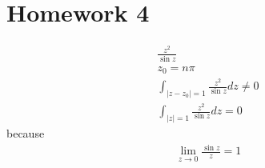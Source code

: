 \chapter{Homework 4} %

\begin{example}

    \begin{align*}
        \frac{z^2}{\sin z}                               \\
        z_0 = n\pi                                       \\
        \int_{|z -z_0| = 1} \frac{z^2}{\sin z} dz \neq 0 \\
        \int_{|z| = 1} \frac{z^2}{\sin z} dz = 0
    \end{align*}
    because
    \begin{align*}
        \lim_{z \to 0} \frac{\sin z}{z} = 1
    \end{align*}
\end{example}